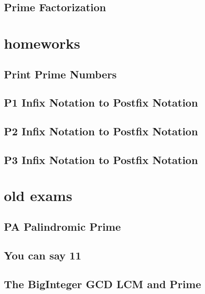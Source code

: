     \subsection{Prime Factorization}
        

\section{homeworks}
    \subsection{Print Prime Numbers}
            
    \subsection{P1 Infix Notation to Postfix Notation}
             
    \subsection{P2 Infix Notation to Postfix Notation}
        
    \subsection{P3 Infix Notation to Postfix Notation}
        

\section{old exams}
    \subsection{PA Palindromic Prime}
            
    \subsection{You can say 11}
        
    \subsection{The BigInteger GCD LCM and Prime}
        
